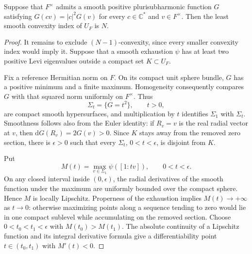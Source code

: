\begin{proposition}\label{prop:homogeneous-psh-sharp-complement-index}
Suppose that $F^\times$ admits a smooth positive plurisubharmonic function $G$ satisfying $G(cv)=|c|^2G(v)$ for every $c\in\mathbb C^*$ and $v\in F^\times$. Then the least smooth convexity index of $U_F$ is $N$.
\end{proposition}
\begin{proof}
It remains to exclude $(N-1)$-convexity, since every smaller convexity index would imply it. Suppose that a smooth exhaustion $\psi$ has at least two positive Levi eigenvalues outside a compact set $K\subset U_F$.

Fix a reference Hermitian norm on $F$. On its compact unit sphere bundle, $G$ has a positive minimum and a finite maximum. Homogeneity consequently compares $G$ with that squared norm uniformly on $F^\times$. Thus
\[
 \Sigma_t=\{G=t^2\},\qquad t>0,
\]
are compact smooth hypersurfaces, and multiplication by $t$ identifies $\Sigma_1$ with $\Sigma_t$. Smoothness follows also from the Euler identity: if $R_v=v$ is the real radial vector at $v$, then $\mathrm dG(R_v)=2G(v)>0$. Since $K$ stays away from the removed zero section, there is $\epsilon>0$ such that every $\Sigma_t$, $0<t<\epsilon$, is disjoint from $K$.

Put
\[
 M(t)=\max_{v\in\Sigma_1}\psi([1:tv]),\qquad 0<t<\epsilon.
\]
On any closed interval inside $(0,\epsilon)$, the radial derivatives of the smooth function under the maximum are uniformly bounded over the compact sphere. Hence $M$ is locally Lipschitz. Properness of the exhaustion implies $M(t)\to+\infty$ as $t\to0$: otherwise maximizing points along a sequence tending to zero would lie in one compact sublevel while accumulating on the removed section. Choose $0<t_0<t_1<\epsilon$ with $M(t_0)>M(t_1)$. The absolute continuity of a Lipschitz function and its integral derivative formula give a differentiability point $t\in(t_0,t_1)$ with $M'(t)<0$.


\end{proof}
